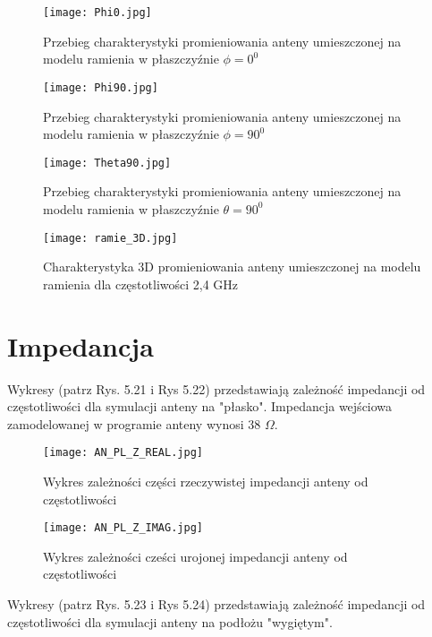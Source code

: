 \begin{figure}[H]
\centering
	\texttt{[image: Phi0.jpg]}
	\caption{Przebieg charakterystyki promieniowania anteny umieszczonej na modelu ramienia w płaszczyźnie $\phi = 0^{0}$}
\end{figure}

\newpage

\begin{figure}[H]
\centering
	\texttt{[image: Phi90.jpg]}
	\caption{Przebieg charakterystyki promieniowania anteny umieszczonej na modelu ramienia w płaszczyźnie $\phi = 90^{0}$}
\end{figure}



\begin{figure}[H]
\centering
	\texttt{[image: Theta90.jpg]}
	\caption{Przebieg charakterystyki promieniowania anteny umieszczonej na modelu ramienia w płaszczyźnie $\theta = 90^{0}$}
\end{figure}

\newpage
\begin{figure}[H]
\centering
	\texttt{[image: ramie\_3D.jpg]}
	\caption{Charakterystyka 3D promieniowania anteny umieszczonej na modelu ramienia dla częstotliwości 2,4 GHz}
\end{figure}





\newpage

\section{Impedancja} 
Wykresy (patrz Rys. 5.21 i Rys 5.22) przedstawiają zależność impedancji od częstotliwości dla symulacji anteny na "płasko". Impedancja wejściowa zamodelowanej w programie anteny wynosi 38 \(\Omega\).

\begin{figure}[h!]
\centering
	\texttt{[image: AN\_PL\_Z\_REAL.jpg]}
	\caption{Wykres zależności części rzeczywistej impedancji anteny od częstotliwości}
\end{figure}

\newpage
\begin{figure}[h!]
\centering
	\texttt{[image: AN\_PL\_Z\_IMAG.jpg]}
	\caption{Wykres zależności cześci urojonej impedancji anteny od częstotliwości}
\end{figure}

\newpage
Wykresy (patrz Rys. 5.23 i Rys 5.24) przedstawiają zależność impedancji od częstotliwości dla symulacji anteny na podłożu "wygiętym".


